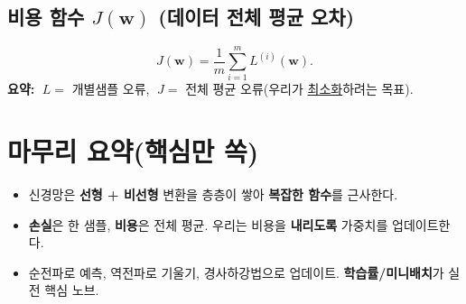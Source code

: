 \documentclass[12pt]{article}
\begin{document}
\subsection{비용 함수 $J(\mathbf{w})$ (데이터 전체 평균 오차)}
\[
J(\mathbf{w}) = \frac{1}{m}\sum_{i=1}^m L^{(i)}(\mathbf{w}).
\]
\textbf{요약:} \(\;L=\) 개별샘플 오류, \(\;J=\) 전체 평균 오류(우리가 \underline{최소화}하려는 목표).

\section*{마무리 요약(핵심만 쏙)}
\begin{itemize}
  \item 신경망은 \textbf{선형 + 비선형} 변환을 층층이 쌓아 \textbf{복잡한 함수}를 근사한다.
  \item \textbf{손실}은 한 샘플, \textbf{비용}은 전체 평균. 우리는 비용을 \textbf{내리도록} 가중치를 업데이트한다.
  \item 순전파로 예측, 역전파로 기울기, 경사하강법으로 업데이트. \textbf{학습률/미니배치}가 실전 핵심 노브.
\end{itemize}
\end{document}

